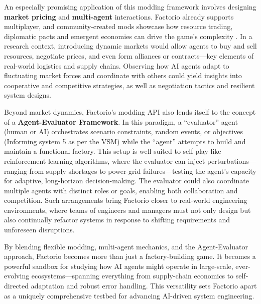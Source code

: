 An especially promising application of this modding framework involves designing \textbf{market pricing} and \textbf{multi-agent} interactions. Factorio already supports multiplayer, and community-created mods showcase how resource trading, diplomatic pacts and emergent economies can drive the game’s complexity \cite{blackMarket, diplomacy}. In a research context, introducing dynamic markets would allow agents to buy and sell resources, negotiate prices, and even form alliances or contracts—key elements of real-world logistics and supply chains. Observing how AI agents adapt to fluctuating market forces and coordinate with others could yield insights into cooperative and competitive strategies, as well as negotiation tactics and resilient system designs.

Beyond market dynamics, Factorio’s modding API also lends itself to the concept of a \textbf{Agent-Evaluator Framework}. In this paradigm, a “evaluator” agent (human or AI) orchestrates scenario constraints, random events, or objectives (Informing system 5 as per the VSM) while the “agent” attempts to build and maintain a functional factory. This setup is well-suited to self play-like reinforcement learning algorithms, where the evaluator can inject perturbations—ranging from supply shortages to power-grid failures—testing the agent’s capacity for adaptive, long-horizon decision-making. The evaluator could also coordinate multiple agents with distinct roles or goals, enabling both collaboration and competition. Such arrangements bring Factorio closer to real-world engineering environments, where teams of engineers and managers must not only design but also continually refactor systems in response to shifting requirements and unforeseen disruptions.

By blending flexible modding, multi-agent mechanics, and the Agent-Evaluator approach, Factorio becomes more than just a factory-building game. It becomes a powerful sandbox for studying how AI agents might operate in large-scale, ever-evolving ecosystems—spanning everything from supply-chain economics to self-directed adaptation and robust error handling. This versatility sets Factorio apart as a uniquely comprehensive testbed for advancing AI-driven system engineering. 

